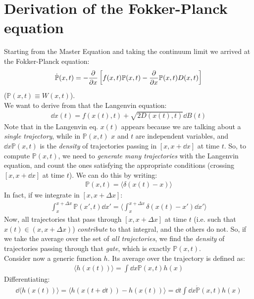 \documentclass[../template.tex]{subfiles}
\begin{document}
\section{Derivation of the Fokker-Planck equation}
Starting from the Master Equation and taking the continuum limit we arrived at the Fokker-Planck equation:
\begin{align*}
    \dot{\mathbb{P}}(x,t) = -\pdv{x}\left[f(x,t) \mathbb{P}(x,t) - \pdv{x}\mathbb{P}(x,t) D(x,t)\right]
\end{align*}
($\mathbb{P}(x,t) \equiv W(x,t)$).\\
We want to derive from that the Langenvin equation:
\begin{align*}
    \dd{x(t)} = f(x(t),t) + \sqrt{2D(x(t),t)} \dd{B(t)}
\end{align*}
Note that in the Langenvin eq. $x(t)$ appears because we are talking about a \textit{single trajectory}, while in $\mathbb{P}(x,t)$ $x$ and $t$ are independent variables, and $\dd{x} \mathbb{P}(x,t)$ is the \textit{density} of trajectories passing in $[x,x+\dd{x}]$ at time $t$. So, to compute $\mathbb{P}(x,t)$, we need to \textit{generate many trajectories} with the Langenvin equation, and count the ones satisfying the appropriate conditions (crossing $[x,x+\dd{x}]$ at time $t$). We can do this by writing:
\begin{align*}
    \mathbb{P}(x,t) = \langle \delta(x(t) -x) \rangle
\end{align*}     
In fact, if we integrate in $[x,x+ \Delta x]$:
\begin{align*}
    \int_x^{x+ \Delta x} \mathbb{P}(x', t)\dd{x'} = \langle \int_x^{x+\Delta x} \delta(x(t) - x')\dd{x'} \rangle
\end{align*} 
Now, all trajectories that pass through $[x,x+\Delta x]$ at time $t$ (i.e. such that $x(t) \in (x, x+ \Delta x)$) \textit{contribute} to that integral, and the others do not. So, if we take the average over the set of \textit{all trajectories}, we find the \textit{density} of trajectories passing through that \textit{gate}, which is exactly $\mathbb{P}(x,t)$.\\
Consider now a generic function $h$. Its average over the trajectory is defined as:
\begin{align*}
    \langle h(x(t)) \rangle = \int \dd{x} \mathbb{P}(x,t) h(x)
\end{align*}
Differentiating:
\begin{align*}
    \dd{\langle h(x(t)) \rangle} = \langle h(x(t+ \dd{t})) - h(x(t)) \rangle = \dd{t} \int \dd{x} \dot{\mathbb{P}}(x,t) h(x)
\end{align*}
\end{document}
